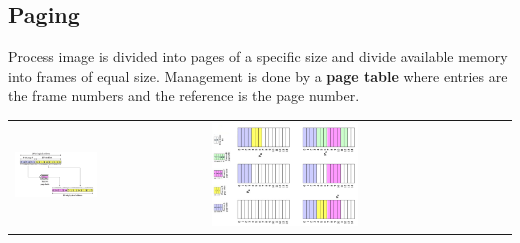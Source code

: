 	\subsection{Paging }
		Process image is divided into pages of a specific size and divide available memory into frames of equal size. Management is done by a \textbf{page table} where entries are the frame numbers and the reference is the page number. 
		
		\begin{tabular}{p{}p{}}
			\vspace{0pt}
			
			\includegraphics[width=0.45\textwidth]{./pictures/pagingAddressTrans.png}
			& \vspace{0pt}
			
			\includegraphics[width=0.5\textwidth]{./pictures/paging.png}
		\end{tabular}	
		